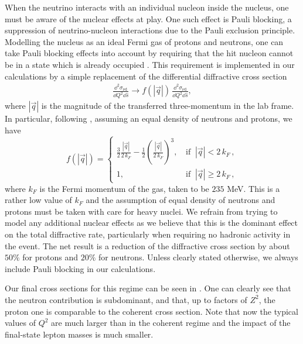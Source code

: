 When the neutrino interacts with an individual nucleon inside the nucleus, one must be aware of the nuclear effects at play. One such effect is Pauli blocking, a suppression of neutrino-nucleon interactions due to the Pauli exclusion principle. Modelling the nucleus as an ideal Fermi gas of protons and neutrons, one can take Pauli blocking effects into account by requiring that the hit nucleon cannot be in a state which is already occupied \cite{Brown:1971qr}. This requirement is implemented in our calculations by a simple replacement of the differential diffractive cross section
\begin{align*}
\frac{\dd^2 \sigma_{\nu  \mathrm{d}}}{\dd Q^2 \dd \hat{s}}\to f (|\vec{q}|) \, \frac{\dd^2 \sigma_{\nu  \mathrm{d}}}{\dd Q^2 \dd \hat{s}},
\end{align*}
where $|\vec{q}|$ is the magnitude of the transferred three-momentum in the lab frame. In particular, following \cite{Brown:1971qr}, assuming an equal density of neutrons and protons, we have
%
\begin{equation}
f (|\vec{q}|) = \begin{cases} \displaystyle
                    \frac{3}{2} \frac{|\vec{q}|}{2 \, k_F} - \frac{1}{2} \left( \frac{|\vec{q}|}{2 \, k_F} \right)^3 ,\, &\mathrm{if }\;\; |\vec{q}| < 2\, k_F\, ,\\
                    1,\, &\mathrm{if }\;\; |\vec{q}| \geq 2 \, k_F\, ,
                \end{cases}
\end{equation}
%
where $k_F$ is the Fermi momentum of the gas, taken to be $235$ MeV. This is a rather low value of $k_F$ and the assumption of equal density of neutrons and protons must be taken with care for heavy nuclei. We refrain from trying to model any additional nuclear effects as we believe that this is the dominant effect on the total diffractive rate, particularly when requiring no hadronic activity in the event. The net result is a reduction of the diffractive cross section by about $50\%$ for protons and $20\%$ for neutrons. Unless clearly stated otherwise, we always include Pauli blocking in our calculations.

Our final cross sections for this regime can be seen in . One can clearly see that the neutron contribution is subdominant, and that, up to factors of $Z^2$, the proton one is comparable to the coherent cross section. Note that now the typical values of $Q^2$ are much larger than in the coherent regime and the impact of the final-state lepton masses is much smaller. 

